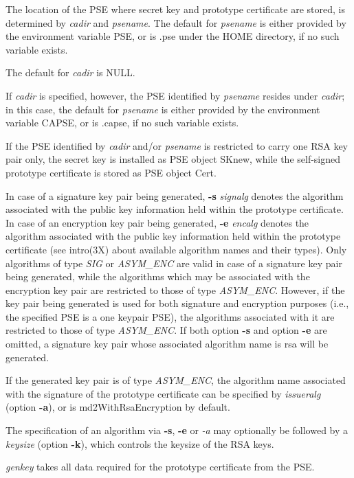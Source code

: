 The location of the PSE where secret key and prototype certificate are stored, is determined by 
{\em cadir} and {\em psename}. The default for {\em 
psename} is either provided by the environment variable PSE, or is .pse under the HOME directory, if no such
variable exists.
 
The default for {\em cadir} is NULL. 

If {\em cadir} is specified,
however, the PSE identified by {\em psename} resides under {\em cadir}; in this case, the default
for {\em psename} is either provided by the environment variable CAPSE, or is .capse, if no such variable
exists.

If the PSE identified by {\em cadir} and/or {\em psename} is restricted to carry one RSA key pair 
only, the secret
key is installed as PSE object SKnew, while the self-signed prototype certificate is stored as PSE object Cert.

In case of a signature key pair being generated, {\bf -s} {\em signalg}
denotes the algorithm associated with the public key information held within the prototype certificate.
In case of an encryption key pair being generated, {\bf -e} {\em encalg}
denotes the algorithm associated with the public key information held within the prototype certificate
(see intro(3X) about available algorithm names and their types).
Only algorithms of type {\em SIG} or {\em ASYM\_ENC} are valid in case of a signature key pair 
being generated, while the algorithms which may be associated with the encryption key pair 
are restricted to those of type {\em ASYM\_ENC}. 
However, if the key pair being generated is used for both signature and encryption purposes
(i.e., the specified PSE is a one keypair PSE), the algorithms associated with
it are restricted to those of type {\em ASYM\_ENC}.
If both option {\bf -s} and option {\bf -e} are omitted, a signature key pair whose
associated algorithm name is rsa will be generated. 

If the generated key pair is of type {\em ASYM\_ENC}, the algorithm name 
associated with the signature of the prototype certificate can be specified by {\em issueralg} 
(option {\bf -a}), or is md2WithRsaEncryption by default. 

The specification of an algorithm via {\bf -s}, {\bf -e} or {\em -a} may optionally
be followed by a {\em keysize} (option {\bf -k}), which controls the keysize of the RSA keys.

{\em genkey} takes all data required for the prototype certificate from the PSE.
 
